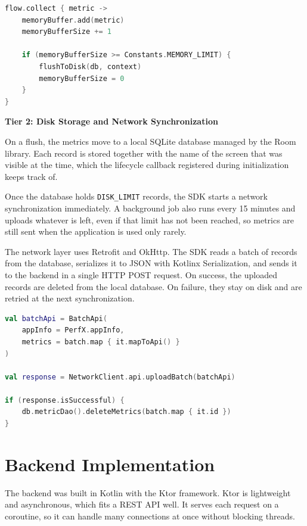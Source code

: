 \begin{lstlisting}[language=Kotlin, caption={In-Memory Buffering}]
flow.collect { metric ->
    memoryBuffer.add(metric)
    memoryBufferSize += 1

    if (memoryBufferSize >= Constants.MEMORY_LIMIT) {
        flushToDisk(db, context)
        memoryBufferSize = 0
    }
}
\end{lstlisting}

\textbf{Tier 2: Disk Storage and Network Synchronization}

On a flush, the metrics move to a local SQLite database managed by the Room library. Each record is stored together with the name of the screen that was visible at the time, which the lifecycle callback registered during initialization keeps track of.

Once the database holds \texttt{DISK\_LIMIT} records, the SDK starts a network synchronization immediately. A background job also runs every 15 minutes and uploads whatever is left, even if that limit has not been reached, so metrics are still sent when the application is used only rarely.

The network layer uses Retrofit and OkHttp. The SDK reads a batch of records from the database, serializes it to JSON with Kotlinx Serialization, and sends it to the backend in a single HTTP POST request. On success, the uploaded records are deleted from the local database. On failure, they stay on disk and are retried at the next synchronization.

\begin{lstlisting}[language=Kotlin, caption={Network Synchronization}]
val batchApi = BatchApi(
    appInfo = PerfX.appInfo,
    metrics = batch.map { it.mapToApi() }
)

val response = NetworkClient.api.uploadBatch(batchApi)

if (response.isSuccessful) {
    db.metricDao().deleteMetrics(batch.map { it.id })
}
\end{lstlisting}

\section{Backend Implementation}
\label{sec:backend_impl}

The backend was built in Kotlin with the Ktor framework. Ktor is lightweight and asynchronous, which fits a REST API well. It serves each request on a coroutine, so it can handle many connections at once without blocking threads.

